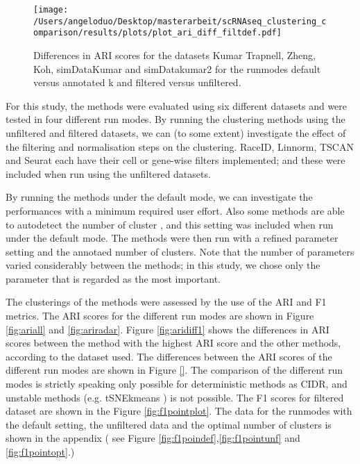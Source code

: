 \documentclass[12pt, a4paper]{article}\usepackage[]{graphicx}\usepackage[]{color}
\begin{document}
\begin{figure}[htp]
\begin{center}
\texttt{[image: /Users/angeloduo/Desktop/masterarbeit/scRNAseq\_clustering\_comparison/results/plots/plot\_ari\_diff\_filtdef.pdf]}
\caption{Differences in ARI scores for the datasets Kumar Trapnell, Zheng, Koh, simDataKumar and simDatakumar2 for the runmodes default versus annotated k and filtered versus unfiltered.}
\label{fig:diff}
\end{center}
\end{figure}

For this study, the methods were evaluated using six different datasets and were tested in four different run modes. By running the clustering methods using the unfiltered and filtered datasets, we can (to some extent) investigate the effect of the filtering and normalisation steps on the clustering. RaceID, Linnorm, TSCAN and Seurat each have their cell or gene-wise filters implemented; and these were included when run using the unfiltered datasets. 

By running the methods under the default mode, we can investigate the performances with a minimum required user effort. Also some methods are able to autodetect the number of cluster , and this setting was included when run under the default mode. The methods were then run with a refined parameter setting and the annotaed number of clusters. Note that the number of parameters varied considerably between the methods; in this study, we chose only the parameter that is regarded as the most important.

The clusterings of the methods were assessed by the use of the ARI and F1 metrics. The ARI scores for the different run modes are shown in Figure \ref{fig:ariall} and \ref{fig:ariradar}.  Figure \ref{fig:aridiff1} shows the differences in ARI scores between the method with the highest ARI score and the other methods, according to the dataset used. The differences between the ARI scores of the different run modes are shown in Figure \ref{}. The comparison of the different run modes is strictly speaking only possible for deterministic methods as CIDR, and unstable methods (e.g. tSNEkmeans ) is not possible. The F1 scores for filtered dataset are shown in the Figure \ref{fig:f1pointplot}. The data for the runmodes with the default setting, the unfiltered data and the optimal number of clusters is shown in the appendix ( see Figure \ref{fig:f1poindef},\ref{fig:f1pointunf} and \ref{fig:f1pointopt}.)
\end{document}
